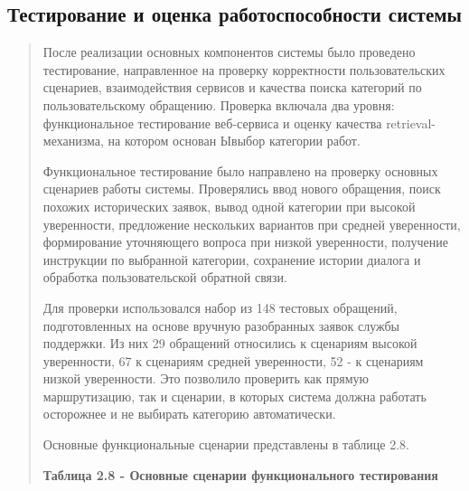 \hypertarget{ux442ux435ux441ux442ux438ux440ux43eux432ux430ux43dux438ux435-ux438-ux43eux446ux435ux43dux43aux430-ux440ux430ux431ux43eux442ux43eux441ux43fux43eux441ux43eux431ux43dux43eux441ux442ux438-ux441ux438ux441ux442ux435ux43cux44b}{%
\subsection{\texorpdfstring{ Тестирование и оценка работоспособности
системы}{ Тестирование и оценка работоспособности системы}}\label{ux442ux435ux441ux442ux438ux440ux43eux432ux430ux43dux438ux435-ux438-ux43eux446ux435ux43dux43aux430-ux440ux430ux431ux43eux442ux43eux441ux43fux43eux441ux43eux431ux43dux43eux441ux442ux438-ux441ux438ux441ux442ux435ux43cux44b}}

\begin{quote}
После реализации основных компонентов системы было проведено
тестирование, направленное на проверку корректности пользовательских
сценариев, взаимодействия сервисов и качества поиска категорий по
пользовательскому обращению. Проверка включала два уровня:
функциональное тестирование веб-сервиса и оценку качества
retrieval-механизма, на котором основан Ывыбор категории работ.

Функциональное тестирование было направлено на проверку основных
сценариев работы системы. Проверялись ввод нового обращения, поиск
похожих исторических заявок, вывод одной категории при высокой
уверенности, предложение нескольких вариантов при средней уверенности,
формирование уточняющего вопроса при низкой уверенности, получение
инструкции по выбранной категории, сохранение истории диалога и
обработка пользовательской обратной связи.

Для проверки использовался набор из 148 тестовых обращений,
подготовленных на основе вручную разобранных заявок службы поддержки. Из
них 29 обращений относились к сценариям высокой уверенности, 67 к
сценариям средней уверенности, 52 - к сценариям низкой уверенности. Это
позволило проверить как прямую маршрутизацию, так и сценарии, в которых
система должна работать осторожнее и не выбирать категорию
автоматически.

Основные функциональные сценарии представлены в таблице 2.8.

\textbf{Таблица 2.8 - Основные сценарии функционального тестирования}
\end{quote}

